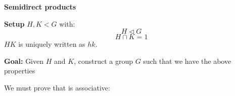 \textbf{Semidirect products}

\textbf{Setup} $ H,K < G $
with:
\[ H \triangleleft G \]
\[ H \cap K = 1 \]
$ HK $ is uniquely written as $ hk $.

\textbf{Goal:} Given $ H $ and $ K $, construct a group $ G $ such that we  have the above properties

We must prove that is associative:

